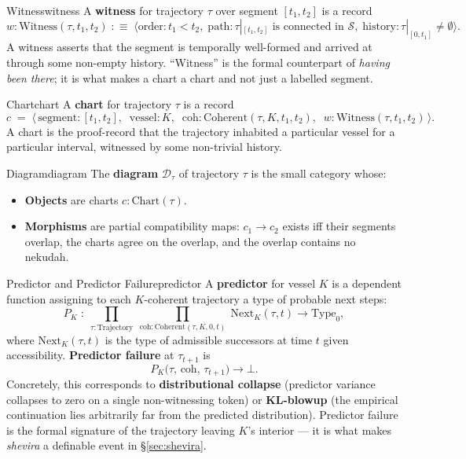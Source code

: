 \documentclass[11pt,a4paper]{article}
\begin{document}
\begin{defbox}{Witness}{witness}
A \textbf{witness} for trajectory $\tau$ over segment $[t_1, t_2]$ is a record
\[
w : \mathrm{Witness}(\tau, t_1, t_2) \;:\equiv\; \big\langle \mathrm{order} : t_1 < t_2,\; \mathrm{path} : \tau|_{[t_1, t_2]} \text{ is connected in } \mathcal{S},\; \mathrm{history} : \tau|_{[0, t_1]} \neq \emptyset \big\rangle.
\]
A witness asserts that the segment is temporally well-formed and arrived at through some non-empty history. ``Witness'' is the formal counterpart of \emph{having been there}; it is what makes a chart a chart and not just a labelled segment.
\end{defbox}

\begin{defbox}{Chart}{chart}
A \textbf{chart} for trajectory $\tau$ is a record
\[
c \;=\; \big\langle\, \mathrm{segment} : [t_1, t_2],\;\; \mathrm{vessel} : K,\;\; \mathrm{coh} : \mathrm{Coherent}(\tau, K, t_1, t_2),\;\; w : \mathrm{Witness}(\tau, t_1, t_2) \,\big\rangle.
\]
A chart is the proof-record that the trajectory inhabited a particular vessel for a particular interval, witnessed by some non-trivial history.
\end{defbox}

\begin{defbox}{Diagram}{diagram}
The \textbf{diagram} $\mathcal{D}_\tau$ of trajectory $\tau$ is the small category whose:
\begin{itemize}
    \item \textbf{Objects} are charts $c : \mathrm{Chart}(\tau)$.
    \item \textbf{Morphisms} are partial compatibility maps: $c_1 \to c_2$ exists iff their segments overlap, the charts agree on the overlap, and the overlap contains no nekudah.
\end{itemize}
\end{defbox}

\begin{defbox}{Predictor and Predictor Failure}{predictor}
A \textbf{predictor} for vessel $K$ is a dependent function assigning to each $K$-coherent trajectory a type of probable next steps:
\[
P_K \;:\; \prod_{\tau : \mathrm{Trajectory}}\; \prod_{\mathrm{coh} : \mathrm{Coherent}(\tau, K, 0, t)}\; \mathrm{Next}_K(\tau, t) \to \mathrm{Type}_0,
\]
where $\mathrm{Next}_K(\tau, t)$ is the type of admissible successors at time $t$ given accessibility. \textbf{Predictor failure} at $\tau_{t+1}$ is
\[
P_K\big(\tau,\, \mathrm{coh},\, \tau_{t+1}\big) \to \bot.
\]
Concretely, this corresponds to \textbf{distributional collapse} (predictor variance collapses to zero on a single non-witnessing token) or \textbf{KL-blowup} (the empirical continuation lies arbitrarily far from the predicted distribution). Predictor failure is the formal signature of the trajectory leaving $K$'s interior — it is what makes \emph{shevira} a definable event in §\ref{sec:shevira}.
\end{defbox}
\end{document}

